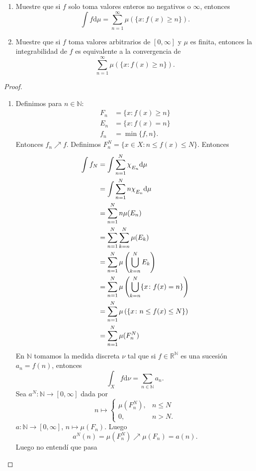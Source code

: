 \documentclass{article}
\theoremstyle{definition}
\theoremstyle{remark}
\numberwithin{equation}{section}
\newcommand{\N}{\mathbb{N}}
\newcommand{\R}{\mathbb{R}}
\renewcommand{\d}{\mathrm{d}}
\newcommand{\oo}{\infty}
\newcommand{\br}[1]{\left( #1 \right)}
\newcommand{\Chi}[1]{\chi_{\raisebox{-.5ex}{$\scriptstyle #1$}}}
\begin{document}
\begin{enumerate}
  \item Muestre que si $f$ solo toma valores enteros no negativos o $\oo$, entonces 
  \[ \int f \d \mu = \sum_{n=1}^\oo \mu(\{x \colon f(x) \geq n\}). \]
  \item Muestre que si $f$ toma valores arbitrarios de $[0,\oo]$ y $\mu$ es finita, entonces la integrabilidad de $f$ es equivalente a la convergencia de 
  \[ \sum_{n=1}^\oo \mu(\{x \colon f(x) \geq n\}). \]
\end{enumerate}

\begin{proof}
  \ 
  \begin{enumerate}
    \item Definimos para $n \in \N$: 
    \begin{align*}
        F_n &= \{x \colon f(x) \geq n\} \\
        E_n &= \{x \colon f(x) = n\} \\
        f_n &= \min\{f,n\}.
    \end{align*}
    Entonces $f_n \nearrow f$. Definimos $F_n^N = \{x \in X \colon n \leq f(x) \leq N\}$. Entonces
    \begin{align*}
        \int f_N &= \int \sum_{n=1}^N \Chi{E_n} \d\mu \\
        &= \int \sum_{n=1}^N n \Chi{E_n} \d\mu \\
        &= \sum_{n=1}^N n \mu(E_n) \\ 
        &= \sum_{n=1}^N \sum_{k=n}^N \mu(E_k) \\
        &= \sum_{n=1}^N \mu\br{\bigcup_{k=n}^N E_k} \\
        &= \sum_{n=1}^N \mu \br{\bigcup_{k=n}^N \{x \colon f(x) = n\}} \\
        &= \sum_{n=1}^N \mu \br{\{x \colon n \leq f(x) \leq N\}} \\
        &= \sum_{n=1}^N \mu (F_n^N)
    \end{align*}
    En $\N$ tomamos la medida discreta $\nu$ tal que si $f \in \R^\N$ es una sucesión $a_n = f(n)$, entonces 
    \[ \int_X f \d\nu = \sum_{n\in\N} a_n. \]
    Sea $a^N \colon \N \to [0,\oo]$ dada por 
    \[ n \mapsto \begin{cases}
      \mu(F_n^N), &n \leq N \\
      0, &n > N.
    \end{cases} \]
    $a \colon \N \to [0,\oo]$, $n \mapsto \mu(F_n)$. Luego 
    \[ a^N(n) = \mu(F_n^N) \nearrow \mu(F_n) = a(n). \]
    Luego no entendí que pasa
  \end{enumerate}
\end{proof}
\end{document}
